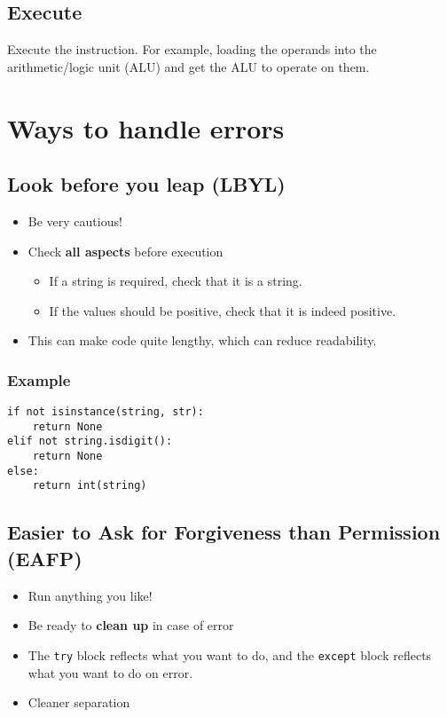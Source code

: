 \documentclass[11pt]{article}
\begin{document}
\subsection{Execute}
\label{sec:orgf1fb894}
Execute the instruction. For example, loading the operands into the arithmetic/logic unit (ALU) and get the ALU to operate on them.

 \newpage

\section{Ways to handle errors}
\label{sec:org0ab7a9d}

\subsection{Look before you leap (LBYL)}
\label{sec:orgfd7b58f}
\begin{itemize}
\item Be very cautious!
\item Check \textbf{all aspects} before execution
\begin{itemize}
\item If a string is required, check that it is a string.
\item If the values should be positive, check that it is indeed positive.
\end{itemize}
\item This can make code quite lengthy, which can reduce readability.
\end{itemize}

\subsubsection{Example}
\label{sec:orgb342af2}
\begin{verbatim}
if not isinstance(string, str):
    return None
elif not string.isdigit():
    return None
else:
    return int(string)
\end{verbatim}

\subsection{Easier to Ask for Forgiveness than Permission (EAFP)}
\label{sec:orgc462c5e}
\begin{itemize}
\item Run anything you like!
\item Be ready to \textbf{clean up} in case of error
\item The \texttt{try} block reflects what you want to do, and the \texttt{except} block reflects what you want to do on error.
\item Cleaner separation
\end{itemize}
\end{document}
